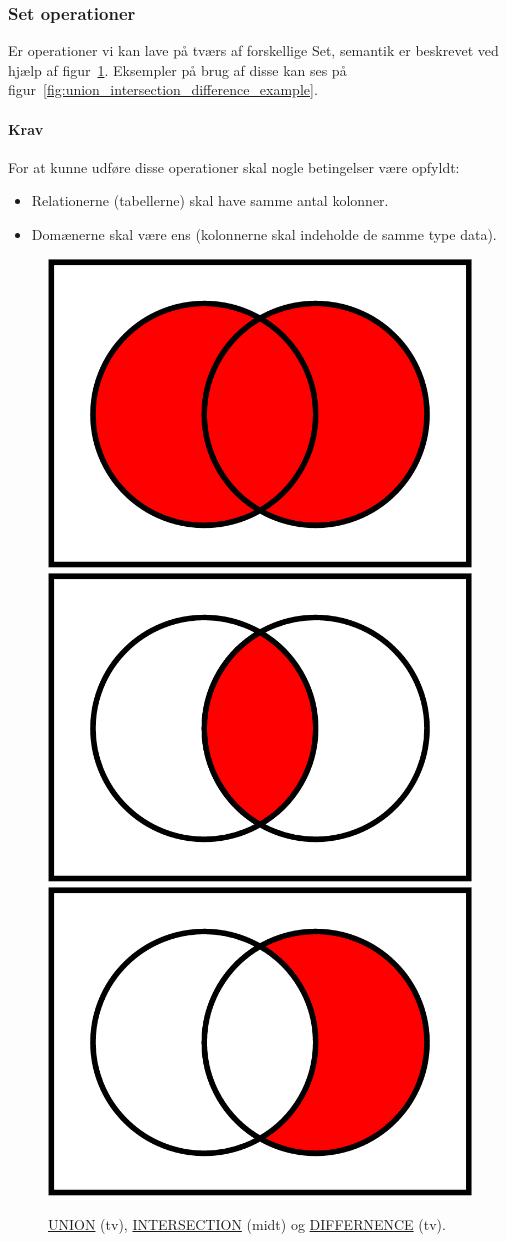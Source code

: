 \subsubsection{Set operationer}

Er operationer vi kan lave på tværs af forskellige Set, semantik er beskrevet ved hjælp af figur~\ref{fig:union_intersection_difference}. Eksempler på brug af disse kan ses på figur~\ref{fig:union_intersection_difference_example}.

\paragraph{Krav}

For at kunne udføre disse operationer skal nogle betingelser være opfyldt: 

\begin{itemize}
	\item Relationerne (tabellerne) skal have samme antal kolonner.
	\item Domænerne skal være ens (kolonnerne skal indeholde de samme type data).
\end{itemize}

\begin{figure}[H]
	\centering
	\includegraphics[width=.3\textwidth]{figs/spm6/union}\hfill
	\includegraphics[width=.3\textwidth]{figs/spm6/intersection}\hfill
	\includegraphics[width=.3\textwidth]{figs/spm6/difference}
	
	\caption{\href{https://en.wikipedia.org/wiki/Union_(set_theory)}{UNION} (tv), \href{https://en.wikipedia.org/wiki/Intersection_(set_theory)}{INTERSECTION} (midt) og \href{https://en.wikipedia.org/wiki/Complement_(set_theory)}{DIFFERNENCE} (tv).}
	\label{fig:union_intersection_difference}	
\end{figure}

